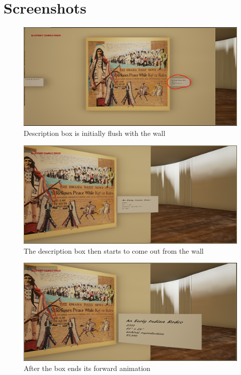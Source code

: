 \section*{Screenshots}
	\begin{figure}
		\caption{Description box is initially flush with the wall}
		\includegraphics[scale=0.5]{Screenshots/Animation1.png}
		\centering
	\end{figure}
	\begin{figure}
		\caption{The description box then starts to come out from the wall}
		\includegraphics[scale=0.5]{Screenshots/Animation2.png}
		\centering
	\end{figure}
	\begin{figure}
		\caption{After the box ends its forward animation}
		\includegraphics[scale=0.5]{Screenshots/Animation3.png}
		\centering
	\end{figure}
